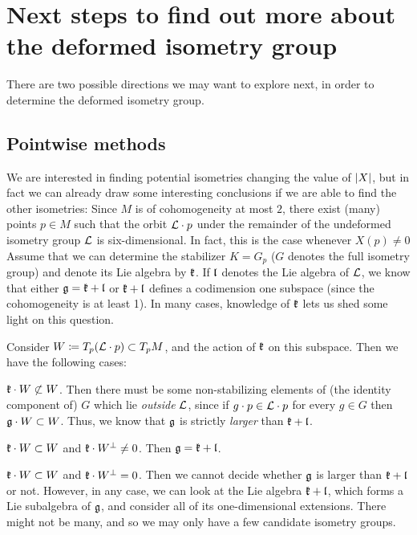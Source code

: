 \documentclass[parskip=half]{scrartcl}
\begin{document}
\section{Next steps to find out more about the deformed isometry group}

There are two possible directions we may want to explore next, in order to determine the deformed isometry group.

\subsection{Pointwise methods}

We are interested in finding potential isometries changing the value of $\lvert X \rvert$, but in fact we can already draw some interesting conclusions if we are able to find the other isometries: Since $M$ is of cohomogeneity at most $2$, there exist (many) points $p\in M$ such that the orbit $\mathcal{L}\cdot p$ under the remainder of the undeformed isometry group $\mathcal{L}$ is six-dimensional. In fact, this is the case whenever $X(p)\neq 0$ 
Assume that we can determine the stabilizer $K=G_p$ ($G$ denotes the full isometry group) and denote its Lie algebra by $\mathfrak{k}$. If $\mathfrak{l}$ denotes the Lie algebra of $\mathcal{L}$, we know that either $\mathfrak{g}=\mathfrak{k} + \mathfrak{l}$ or $\mathfrak{k} + \mathfrak{l}$ defines a codimension one subspace (since the cohomogeneity is at least 1). In many cases, knowledge of $\mathfrak{k}$ lets us shed some light on this question.

Consider $W\coloneqq T_p (\mathcal{L}\cdot p)\subset T_p M$, and the action of $\mathfrak{k}$ on this subspace. Then we have the following cases:
\begin{numberedlist}
	\item $\mathfrak{k}\cdot W\not\subset W$. Then there must be some non-stabilizing elements of (the identity component of) $G$ which lie \emph{outside} $\mathcal{L}$, since if $g\cdot p\in \mathcal{L}\cdot p$ for every $g\in G$ then $\mathfrak{g}\cdot W\subset W$. Thus, we know that $\mathfrak{g}$ is strictly \emph{larger} than $\mathfrak{k} +\mathfrak{l}$.
	\item $\mathfrak{k}\cdot W\subset W$ and $\mathfrak{k} \cdot W^\perp \neq 0$. Then $\mathfrak{g}=\mathfrak{k} + \mathfrak{l}$.
	\item $\mathfrak{k} \cdot W\subset W$ and $\mathfrak{k} \cdot W^\perp=0$. Then we cannot decide whether $\mathfrak{g}$ is larger than $\mathfrak{k} +\mathfrak{l}$ or not. However, in any case, we can look at the Lie algebra $\mathfrak{k} +\mathfrak{l}$, which forms a Lie subalgebra of $\mathfrak{g}$, and consider all of its one-dimensional extensions. There might not be many, and so we may only have a few candidate isometry groups.
\end{numberedlist}
\end{document}
